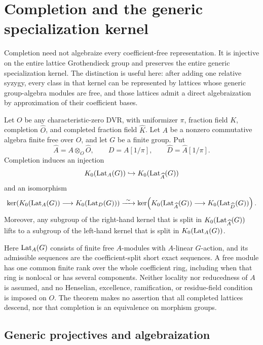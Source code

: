 \section{Completion and the generic specialization kernel}
\label{sec:completion-generic-kernel}

Completion need not algebraize every coefficient-free representation.
It is injective on the entire lattice Grothendieck group and preserves
the entire generic specialization kernel.
The distinction is useful here: after adding one relative syzygy,
every class in that kernel can be represented by lattices whose
generic group-algebra modules are free, and those lattices admit a
direct algebraization by approximation of their coefficient bases.

\begin{theorem}\label{thm:completion-generic-kernel}\label{thm:completion-dvr-kernel}
Let $O$ be any characteristic-zero DVR, with uniformizer $\pi$,
fraction field $K$, completion $\widehat O$, and completed fraction
field $\widehat K$.  Let $A$ be a nonzero commutative algebra finite
free over $O$, and let $G$ be a finite group.  Put
\[
 \widehat A=A\otimes_O\widehat O,\qquad
 D=A[1/\pi],\qquad \widehat D=\widehat A[1/\pi].
\]
Completion induces an injection
\[
 K_0(\operatorname{Lat}_A(G))\hookrightarrow K_0(\operatorname{Lat}_{\widehat A}(G))
\]
and an isomorphism
\[
 \ker\!\left(K_0(\operatorname{Lat}_A(G))\longrightarrow K_0(\operatorname{Lat}_D(G))\right)
 \xrightarrow{\ \sim\ }
 \ker\!\left(K_0(\operatorname{Lat}_{\widehat A}(G))
                   \longrightarrow K_0(\operatorname{Lat}_{\widehat D}(G))\right).
\]
Moreover, any subgroup of the right-hand kernel that is split in
$K_0(\operatorname{Lat}_{\widehat A}(G))$ lifts to a subgroup of the left-hand
kernel that is split in $K_0(\operatorname{Lat}_A(G))$.
\end{theorem}

Here $\operatorname{Lat}_A(G)$ consists of finite free $A$-modules with
$A$-linear $G$-action, and its admissible sequences are the
coefficient-split short exact sequences.  A free module has one common
finite rank over the whole coefficient ring, including when that ring
is nonlocal or has several components.  Neither locality nor
reducedness of $A$ is assumed, and no Henselian, excellence,
ramification, or residue-field condition is imposed on $O$.  The theorem makes no assertion that all
completed lattices descend, nor that completion is an equivalence
on morphism groups.

\subsection{Generic projectives and algebraization}

